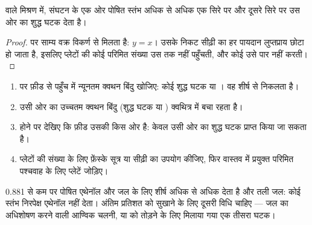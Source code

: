 \begin{proposition}[स्तंभ स्थिरक्वाथी को पार नहीं कर सकता]\label{prop:b2:liquid-vapour-diagrams:azeotrope-limit}
 वाले मिश्रण में,  संघटन के एक ओर
पोषित स्तंभ अधिक से अधिक एक सिरे पर  और दूसरे सिरे पर उस ओर का शुद्ध घटक
देता है।
\end{proposition}

\begin{proof}
 पर साम्य वक्र विकर्ण से मिलता है: $y = x$। उसके निकट
सीढ़ी का हर पायदान लुप्तप्राय छोटा हो जाता है, इसलिए प्लेटों की कोई परिमित संख्या
उस तक नहीं पहुँचती, और कोई उसे पार नहीं करती।
\end{proof}

\begin{method}[प्रभाजी आसवन का पूर्वानुमान]\label{met:b2:liquid-vapour-diagrams:predict-distillation}
\begin{enumerate}
  \item {} पर फ़ीड से पहुँच में न्यूनतम क्वथन बिंदु
        खोजिए: कोई शुद्ध घटक या । वह
        शीर्ष से निकलता है।
  \item उसी ओर का उच्चतम क्वथन बिंदु (शुद्ध घटक या
        ) क्वथित्र में बचा रहता है।
  \item {} होने पर देखिए कि फ़ीड उसकी किस ओर है: केवल उसी
        ओर का शुद्ध घटक प्राप्त किया जा सकता है।
  \item प्लेटों की संख्या के लिए फ़ेंस्के सूत्र या सीढ़ी का उपयोग कीजिए,
        फिर वास्तव में प्रयुक्त परिमित पश्चवाह के लिए प्लेटें जोड़िए।
\end{enumerate}
\end{method}

0.881 से कम पर पोषित एथेनॉल और जल के लिए शीर्ष अधिक से अधिक
 देता है और तली जल: कोई स्तंभ निरपेक्ष एथेनॉल नहीं देता। अंतिम
प्रतिशत को सुखाने के लिए दूसरी विधि चाहिए --- जल का अधिशोषण करने वाली आण्विक चलनी, या
 को तोड़ने के लिए मिलाया गया एक तीसरा घटक।

